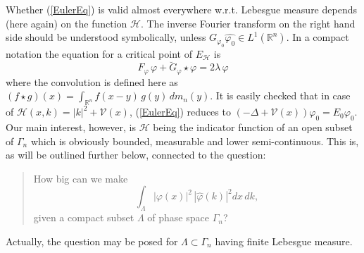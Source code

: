 \documentclass[12pt,a4paper]{article}
\newcommand{\RR}[1]{\mathbb{R}^#1}
\newcommand{\HH}{\mathcal{H}}
\newcommand{\VV}{\mathcal{V}}
\begin{document}
Whether (\ref{EulerEq}) is valid almost everywhere w.r.t. Lebesgue measure 
depends (here again) on the function $\HH$. The inverse Fourier transform on
the right hand side should be understood symbolically, unless 
$G_{\varphi_0}\hat{\varphi_0}\in L^1(\RR n)$. In a compact notation the
equation for a critical point of $E_\HH$ is 
\begin{displaymath}
  F_{\varphi}\,\varphi+ {\breve{G}_{\varphi}} \star\varphi = 2\lambda\,\varphi                     
\end{displaymath}
where the convolution is defined here as 
$(f\star g)(x)=\int_{\RR n} f(x-y)\,g(y)\,dm_n(y)$. It is easily checked that
in case of $\HH(x,k)=|k|^2+\VV(x)$, (\ref{EulerEq}) reduces to 
$(-\Delta+\VV(x)) \varphi_0=E_0 \varphi_0$. Our main interest, however, is
$\HH$ being the indicator function of an open subset of $\Gamma_n$ which is
obviously bounded, measurable and lower semi-continuous. This is, as will
be outlined further below, connected to the question:
\begin{verse}
    How big can we make 
    \begin{equation}
             \int_{\Lambda} |\varphi(x)|^2 \, |\hat\varphi(k)|^2 dx\,dk,
    \end{equation}
    given a compact subset $\Lambda$ of phase space $\Gamma_n$?
\end{verse} 
Actually, the question may be posed for $\Lambda\subset\Gamma_n$ having finite
Lebesgue measure.
\end{document}
